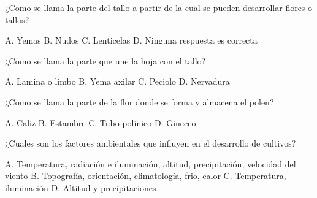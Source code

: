 \documentclass[11pt]{exam}
\begin{document}
{\begin{questions}
\question ¿Como se llama la parte del tallo a partir de la cual se pueden
  desarrollar flores o tallos?
  \begin{checkboxes}
    \CorrectChoice A. Yemas
    \choice B. Nudos
    \choice C. Lenticelas
    \choice D. Ninguna respuesta es correcta
  \end{checkboxes}

\question ¿Como se llama la parte que une la hoja con el tallo?
  \begin{checkboxes}
    \choice A. Lamina o limbo
    \choice B. Yema axilar
    \CorrectChoice C. Peciolo
    \choice D. Nervadura
  \end{checkboxes}

\question ¿Como se llama la parte de la flor donde se forma y almacena el polen?
  \begin{checkboxes}
    \choice A. Caliz
    \CorrectChoice B. Estambre
    \choice C. Tubo polínico
    \choice D. Gineceo
  \end{checkboxes}

\question ¿Cuales son los factores ambientales que influyen en el desarrollo de
  cultivos?
  \begin{checkboxes}
    \CorrectChoice A. Temperatura, radiación e iluminación, altitud, precipitación,
    velocidad del viento
    \choice B. Topografía, orientación, climatología, frio, calor
    \choice C. Temperatura, iluminación
    \choice D. Altitud y precipitaciones
  \end{checkboxes}
\end{questions}}
\end{document}
